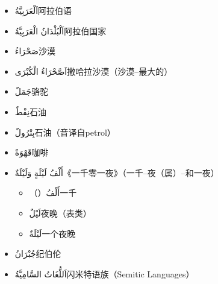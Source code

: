 \begin{itemize}
    \item \ac{اَلْعَرَبِيَّةُ}{阿拉伯语}
    \item \ac{اَلْبُلْدَانُ الْعَرَبِيَّةُ}{阿拉伯国家}
    \item \ac{صَحْرَاءُ}{沙漠}
    \item \ac{اَصَّحْرَاءُ الْكُبْرَى}{撒哈拉沙漠（沙漠--最大的）}
    \item \ac{جَمَلٌ}{骆驼}
    \item \ac{نِفْطٌ}{石油}
    \item \ac{بِتْرُولٌ}{石油（音译自petrol）}
    \item \ac{قَهْوَةٌ}{咖啡}
    \item \ac{أَلْفُ لَيْلَةٍ وَلَيْلَةٌ}{《一千零一夜》（一千--夜（属）--和一夜）}
    \begin{itemize}
        \item （）\ac{أَلْفُ}{一千}
        \item \ac{لَيْلٌ}{夜晚（表类）}
        \item \ac{لَيْلَةٌ}{一个夜晚}
    \end{itemize}
    \item \ac{جُبْرَانُ}{纪伯伦}
    \item \ac{اَللُّغَاتُ السَّامِيَّةُ}{闪米特语族（Semitic Languages）}
\end{itemize}







